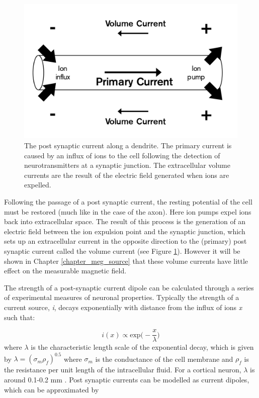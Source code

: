 \begin{figure}
	\begin{center}
		\includegraphics[width=0.8\linewidth]{./images/chapter1/dendrite.png}\caption{The post synaptic current along a dendrite. The primary current is caused by an influx of ions to the cell following the detection of neurotransmitters at a synaptic junction. The extracellular volume currents are the result of the electric field generated when ions are expelled. }\label{fig_1_b2}
	\end{center}
\end{figure}  

Following the passage of a post synaptic current, the resting potential of the cell must be restored (much like in the case of the axon). Here ion pumps expel ions back into extracellular space. The result of this process is the generation of an electric field between the ion expulsion point and the synaptic junction, which sets up an extracellular current in the opposite direction to the (primary) post synaptic current called the volume current (see Figure \ref{fig_1_b2}). However it will be shown in Chapter \ref{chapter_meg_source} that these volume currents have little effect on the measurable magnetic field.

The strength of a post-synaptic current dipole can be calculated through a series of experimental measures of neuronal properties. Typically the strength of a current source, \textit{i}, decays exponentially with distance from the influx of ions \textit{x} such that:

\begin{equation}
i(x) \propto \text{exp}\Bigg(-\frac{x}{\lambda}\Bigg)
\end{equation} where $\lambda$ is the characteristic length scale of the exponential decay, which is given by $\lambda=(\sigma_m\rho_f)^{0.5}$ where $\sigma_m$ is the conductance of the cell membrane and $\rho_f$ is the resistance per unit length of the intracellular fluid. For a cortical neuron, $\lambda$ is around 0.1-0.2 mm \citep{Scott1977}. Post synaptic currents can be modelled as current dipoles, which can be approximated by

